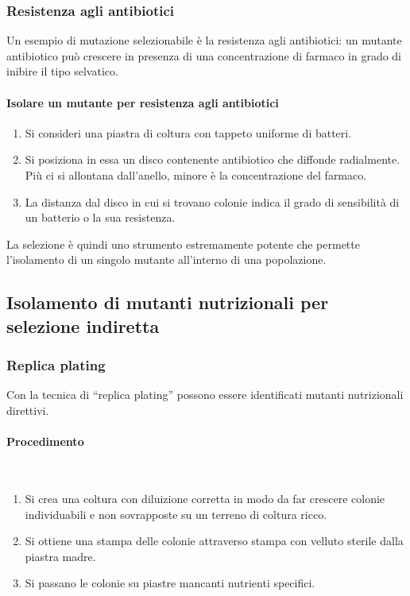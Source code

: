 		\subsubsection{Resistenza agli antibiotici}
		Un esempio di mutazione selezionabile \`e la resistenza agli antibiotici:
		un mutante antibiotico pu\`o crescere in presenza di una concentrazione di farmaco in grado di inibire il tipo selvatico.

			\paragraph{Isolare un mutante per resistenza agli antibiotici}
			\begin{multicols}{2}
				\begin{enumerate}
					\item Si consideri una piastra di coltura con tappeto uniforme di batteri.
    					\item Si posiziona in essa un disco contenente antibiotico che diffonde radialmente. 
						Più ci si allontana dall'anello, minore è la concentrazione del farmaco.
    					\item La distanza dal disco in cui si trovano colonie indica il grado di sensibilit\`a di un batterio o la sua resistenza.
				\end{enumerate}
			\end{multicols}
			La selezione è quindi uno strumento estremamente potente che permette l'isolamento di un singolo mutante all'interno di una popolazione. 

	\subsection{Isolamento di mutanti nutrizionali per selezione indiretta}

		\subsubsection{Replica plating}
		Con la tecnica di ``replica plating'' possono essere identificati mutanti nutrizionali direttivi. 

			\paragraph{Procedimento}\mbox{}\\
			\begin{multicols}{2}
				\begin{enumerate}
					\item Si crea una coltura con diluizione corretta in modo da far crescere colonie individuabili e non sovrapposte su un terreno di coltura ricco.
					\item Si ottiene una stampa delle colonie attraverso stampa con velluto sterile dalla piastra madre.
					\item Si passano le colonie su piastre mancanti nutrienti specifici.
				\end{enumerate}
			\end{multicols}
	

